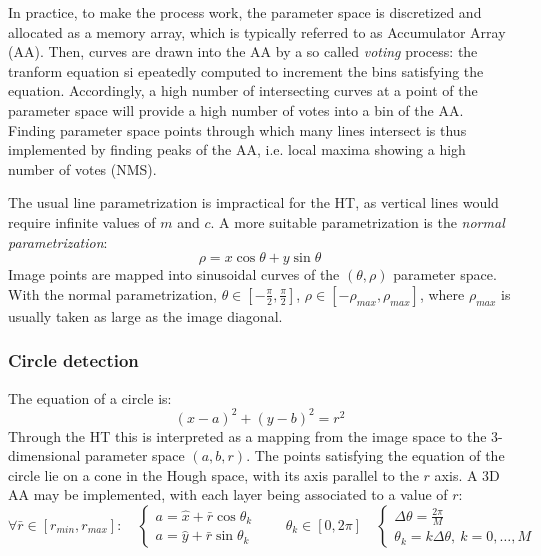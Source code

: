 \documentclass{article}
\begin{document}
In practice, to make the process work, the parameter space is discretized and allocated as a memory array, which is typically referred to as Accumulator Array (AA). Then, curves are drawn into the AA by a so called \emph{voting} process: the tranform equation si epeatedly computed to increment the bins satisfying the equation. Accordingly, a high number of intersecting curves at a point of the parameter space will provide a high number of votes into a bin of the AA. Finding parameter space points through which many lines intersect is thus implemented by finding peaks of the AA, i.e. local maxima showing a high number of votes (NMS).

The usual line parametrization is impractical for the HT, as vertical lines would require infinite values of $m$ and $c$. A more suitable parametrization is the \emph{normal parametrization}: 
\[
    \rho = x\cos\theta + y\sin\theta
\]
Image points are mapped into sinusoidal curves of the $(\theta, \rho)$ parameter space. With the normal parametrization, $\theta\in\left[-\displaystyle\frac{\pi}{2}, \displaystyle\frac{\pi}{2}\right]$, $\rho\in \left[-\rho_{max},\rho_{max}\right]$, where $\rho_{max}$ is usually taken as large as the image diagonal. 

\subsubsection{Circle detection}
The equation of a circle is:
\[
    (x-a)^2+(y-b)^2 = r^2
\]
Through the HT this is interpreted as a mapping from the image space to the 3-dimensional parameter space $(a,b,r)$. The points satisfying the equation of the circle lie on a cone in the Hough space, with its axis parallel to the $r$ axis. A 3D AA may be implemented, with each layer being associated to a value of $r$:
\[
    \forall \bar{r} \in [r_{min}, r_{max}]: \quad \begin{cases}
        a = \hat{x} + \bar{r}\cos\theta_k\\
        a = \hat{y} + \bar{r}\sin\theta_k
    \end{cases} \qquad \theta_k \in \left[0,2\pi\right] \quad \begin{cases}
        \Delta \theta = \displaystyle\frac{2\pi}{M}\\
        \theta_k = k\Delta \theta, \ k=0,\dots,M
    \end{cases}
\]
\end{document}
